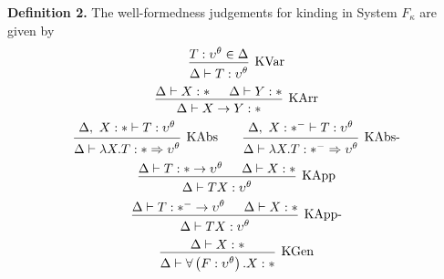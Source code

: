 \documentclass[../../Dissertation.tex]{subfiles}
\begin{document}
{
\noindent
\textbf{Definition 2.} The well-formedness judgements for kinding in System $F_\kappa$ are given by
\begin{equation*}
  \begin{prooftree}
    \hypo{T : \upsilon^\theta \in \Delta}
    \infer1[KVar]{\Delta \vdash T : \upsilon^\theta}
  \end{prooftree}
\end{equation*}
\begin{equation*}
  \begin{prooftree}
    \hypo{\Delta \vdash X : *}
    \hypo{\Delta \vdash Y : *}
    \infer2[KArr]{\Delta \vdash X \rightarrow Y : *}
  \end{prooftree}
\end{equation*}
\begin{equation*}
  \begin{prooftree}
    \hypo{\Delta,\ X : * \vdash T : \upsilon^\theta}
    \infer1[KAbs]{\Delta \vdash \lambda X.T : * \Rightarrow \upsilon^\theta}
  \end{prooftree}\qquad
  \begin{prooftree}
      \hypo{\Delta,\ X : *^- \vdash T : \upsilon^\theta}
      \infer1[KAbs-]{\Delta \vdash \lambda X.T : *^- \Rightarrow \upsilon^\theta}
  \end{prooftree}
\end{equation*}
\begin{equation*}
  \begin{prooftree}
    \hypo{\Delta \vdash T : * \rightarrow \upsilon^\theta}
    \hypo{\Delta \vdash X : *}
    \infer2[KApp]{\Delta \vdash T X : \upsilon^\theta}
  \end{prooftree}
\end{equation*}
\begin{equation*} 
  \begin{prooftree}
    \hypo{\Delta \vdash T : *^- \rightarrow \upsilon^\theta}
    \hypo{\Delta \vdash X : *}
    \infer2[KApp-]{\Delta \vdash T X : \upsilon^\theta}
  \end{prooftree}
\end{equation*}
\begin{equation*}
  \begin{prooftree}
    \hypo{\Delta \vdash X : *}
    \infer1[KGen]{\Delta \vdash \forall \left(F : \upsilon^\theta\right).X : *}
  \end{prooftree}
\end{equation*}
}
\end{document}
